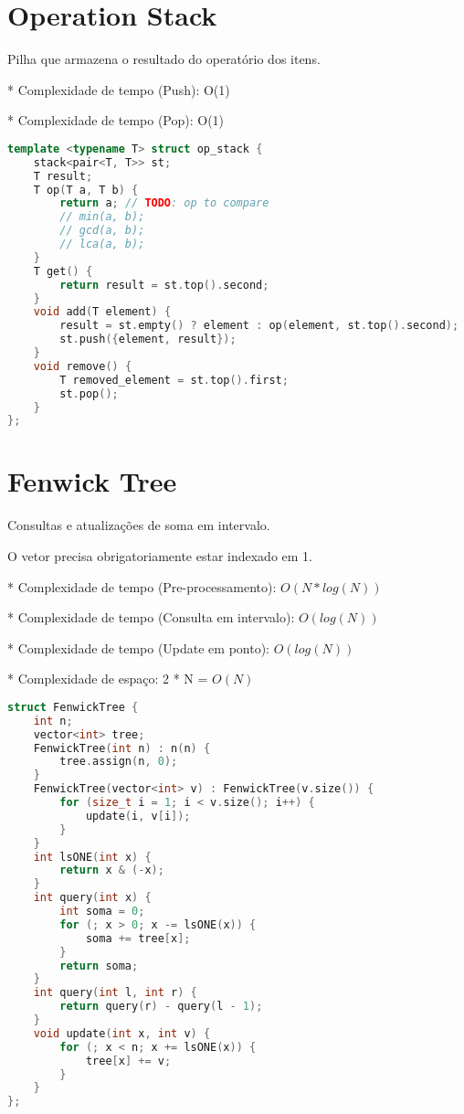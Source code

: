 \documentclass[11pt, a4paper, oneside]{book}
\begin{document}
\hfill

\section{Operation Stack}


Pilha que armazena o resultado do operatório dos itens.



* Complexidade de tempo (Push): O(1)

* Complexidade de tempo (Pop): O(1)

\hfill

\begin{multicols}{2}
\begin{lstlisting}[language=C++]
template <typename T> struct op_stack {
    stack<pair<T, T>> st;
    T result;
    T op(T a, T b) {
        return a; // TODO: op to compare
        // min(a, b);
        // gcd(a, b);
        // lca(a, b);
    }
    T get() {
        return result = st.top().second;
    }
    void add(T element) {
        result = st.empty() ? element : op(element, st.top().second);
        st.push({element, result});
    }
    void remove() {
        T removed_element = st.top().first;
        st.pop();
    }
};
\end{lstlisting}
\end{multicols}

\hfill

\section{Fenwick Tree}


Consultas e atualizações de soma em intervalo.



O vetor precisa obrigatoriamente estar indexado em 1.



* Complexidade de tempo (Pre-processamento): $O(N * log(N))$

* Complexidade de tempo (Consulta em intervalo): $O(log(N))$

* Complexidade de tempo (Update em ponto): $O(log(N))$

* Complexidade de espaço: 2 * N = $O(N)$
\hfill

\begin{multicols}{2}
\begin{lstlisting}[language=C++]
struct FenwickTree {
    int n;
    vector<int> tree;
    FenwickTree(int n) : n(n) {
        tree.assign(n, 0);
    }
    FenwickTree(vector<int> v) : FenwickTree(v.size()) {
        for (size_t i = 1; i < v.size(); i++) {
            update(i, v[i]);
        }
    }
    int lsONE(int x) {
        return x & (-x);
    }
    int query(int x) {
        int soma = 0;
        for (; x > 0; x -= lsONE(x)) {
            soma += tree[x];
        }
        return soma;
    }
    int query(int l, int r) {
        return query(r) - query(l - 1);
    }
    void update(int x, int v) {
        for (; x < n; x += lsONE(x)) {
            tree[x] += v;
        }
    }
};
\end{lstlisting}
\end{multicols}
\end{document}
